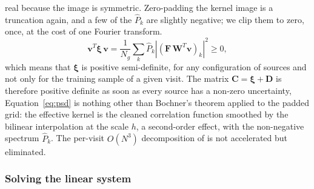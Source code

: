 real because the image is symmetric.
Zero-padding the kernel image is a truncation again, and a few of the $\hat{P}_k$ are slightly negative; we clip them to zero, once, at the cost of one Fourier transform.
\begin{equation}
\label{eq:psd}
\mathbf{v}^T \boldsymbol{\xi}\, \mathbf{v} = \frac{1}{N_g} \sum_k \hat{P}_k \left| (\mathbf{F}\, \mathbf{W}^T \mathbf{v})_k \right|^2 \ge 0 ,
\end{equation}
which means that $\boldsymbol{\xi}$ is positive semi-definite, for any configuration of sources and not only for the training sample of a given visit.
The matrix $\mathbf{C} = \boldsymbol{\xi} + \mathbf{D}$ is therefore positive definite as soon as every source has a non-zero uncertainty, 
Equation~\ref{eq:psd} is nothing other than Bochner's theorem applied to the padded grid: the effective kernel is the cleaned correlation function smoothed 
by the bilinear interpolation at the scale $h$, a second-order effect, with the non-negative spectrum $\hat{P}_k$.
The per-visit $O(N^3)$ decomposition of  is not accelerated but eliminated.

\subsubsection{Solving the linear system}
\label{sec:turbogp_solve}

